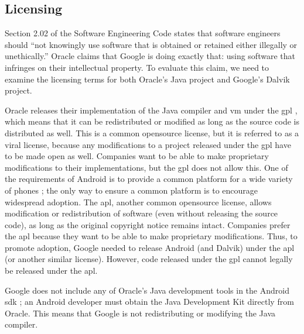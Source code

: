 \documentclass[11pt]{article}
\begin{document}
\begin{multicols}{2}

\subsection{Licensing} %
\label{sub:licensing}

Section 2.02 of the Software Engineering Code states that software engineers
should ``not knowingly use software that is obtained or retained either
illegally or unethically.'' \cite[\S2.02]{secode}  Oracle claims that Google is
doing exactly that: using software that infringes on their intellectual
property.  To evaluate this claim, we need to examine the licensing terms for
both Oracle's Java project and Google's Dalvik project.

Oracle releases their implementation of the Java compiler and \gls{vm} under the
\gls{gpl} \cite{openjdk-license}, which means that it can be redistributed or
modified as long as the source code is distributed as well.  This is a common
\gls{opensource} license, but it is referred to as a viral license, because any
modifications to a project released under the \gls{gpl} have to be made open as
well.  \cite[\S5]{gpl-license} Companies want to be able to make proprietary
modifications to their implementations, but the \gls{gpl} does not allow this.
One of the requirements of Android is to provide a common platform for a wide
variety of phones \cite{open-handset-alliance-ann}; the only way to ensure a
common platform is to encourage widespread adoption.  The \gls{apl}, another
common \gls{opensource} license, allows modification or redistribution of
software (even without releasing the source code), as long as the original
copyright notice remains intact. \cite[\S4]{apache-license} Companies prefer the
\gls{apl} because they want to be able to make proprietary modifications.
\cite{why-apache2-license} Thus, to promote adoption, Google needed to release
Android (and Dalvik) under the \gls{apl} (or another similar license).  However,
code released under the \gls{gpl} cannot legally be released under the
\gls{apl}. \cite{apache-license-gpl}

Google does not include any of Oracle's Java development tools in the Android
\gls{sdk} \cite{android-sdk-installing}; an Android developer must obtain the
Java Development Kit directly from Oracle.  This means that Google is not
redistributing or modifying the Java compiler.


\end{multicols}
\end{document}
